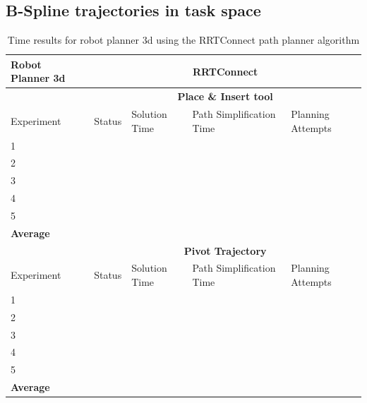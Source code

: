\subsection{B-Spline trajectories in task space}

\begin{table}[H]
\centering
\begin{tabular}{|p{2cm}|c|p{3cm}|p{3cm}|p{3cm}|}
\hline
Robot Planner 3d           & \multicolumn{4}{c}{\textbf{RRTConnect}}                                                                                                 \vline \\
\hline
                          & \multicolumn{4}{c}{\textbf{Place \& Insert tool}}                     \vline \\
\hline
Experiment                & Status & Solution Time & Path Simplification Time & Planning Attempts  \\
\hline
1                         &        &               &                          &  \\
2                         &        &               &                          &  \\
3                         &        &               &                          &  \\
4                         &        &               &                          &  \\
5                         &        &               &                          &  \\
\hline
\textbf{Average} & 	& 	& 	&  \\
\hline
                          & \multicolumn{4}{c}{\textbf{Pivot Trajectory}}                     \vline \\
\hline
Experiment                & Status & Solution Time & Path Simplification Time & Planning Attempts  \\
\hline
1                         &        &               &                          &  \\
2                         &        &               &                          &  \\
3                         &        &               &                          &  \\
4                         &        &               &                          &  \\
5                         &        &               &                          &  \\
\hline
\textbf{Average} & 	& 	& 	&  \\
\hline
\end{tabular}
\caption{Time results for robot planner 3d using the RRTConnect path planner algorithm}
\label{robot-planner3a-rrtconnect-data}
\end{table}



